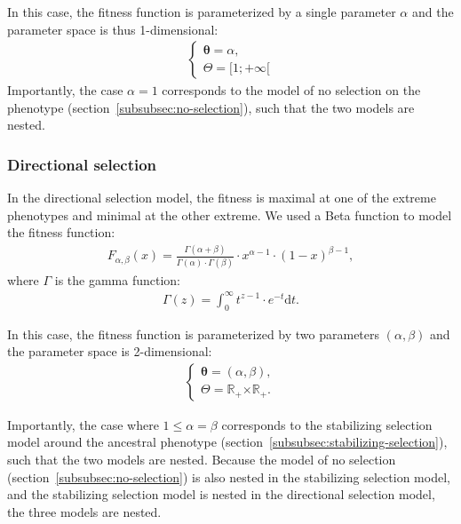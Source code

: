 \documentclass{article}
\newcommand{\der}{\text{d}}
\newcommand{\Multiply}{\cdot}
\newcommand{\CrossMultiply}{\bm{\times}}
\newcommand{\PhenoDef}{x}
\newcommand{\FitParam}{\bm{\theta}}
\newcommand{\FitParamSet}{\Theta}
\newcommand{\PhenoFitMapDef}{F}
\begin{document}
    In this case, the fitness function is parameterized by a single parameter $\alpha$ and the parameter space is thus 1-dimensional:
    \begin{gather}
        \begin{cases}
            \FitParam = \alpha,\\
            \FitParamSet = [ 1 ; +\infty [
        \end{cases}
    \end{gather}
    Importantly, the case $\alpha = 1$ corresponds to the model of no selection on the phenotype (section~\ref{subsubsec:no-selection}), such that the two models are nested.

    \subsubsection{Directional selection}
    \label{subsubsec:directional-selection}
    In the directional selection model, the fitness is maximal at one of the extreme phenotypes and minimal at the other extreme.
    We used a Beta function to model the fitness function:
    \begin{align}
        \PhenoFitMapDef_{\alpha, \beta} (\PhenoDef) = \frac {\Gamma (\alpha +\beta )}{\Gamma (\alpha ) \Multiply \Gamma (\beta )} \Multiply \PhenoDef^{\alpha -1} \Multiply (1-\PhenoDef)^{\beta -1},
    \end{align}
    where $\Gamma$ is the gamma function:
    \begin{align}
        \Gamma (z)=\int _{0}^{\infty }t^{z-1} \Multiply e^{-t} \der t.
    \end{align}

    In this case, the fitness function is parameterized by two parameters $(\alpha, \beta)$ and the parameter space is 2-dimensional:
    \begin{gather}
        \begin{cases}
            \FitParam = (\alpha, \beta),\\
            \FitParamSet = \mathbb{R}_{+} \CrossMultiply \mathbb{R}_{+}.
        \end{cases}
    \end{gather}

    Importantly, the case where $1 \leq \alpha = \beta $ corresponds to the stabilizing selection model around the ancestral phenotype (section~\ref{subsubsec:stabilizing-selection}), such that the two models are nested.
    Because the model of no selection (section~\ref{subsubsec:no-selection}) is also nested in the stabilizing selection model, and the stabilizing selection model is nested in the directional selection model, the three models are nested.
\end{document}
